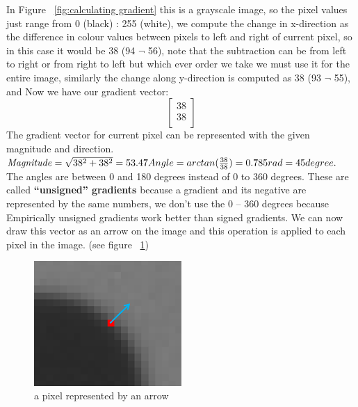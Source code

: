 In Figure ~\ref{fig:calculating gradient} this is a grayscale image, so the pixel values just range from 0 (black) : 255 (white), we compute the change in x-direction as the difference in colour values between pixels to left and right of current pixel, so in this case it would be 38 (94 $ \neg $ 56), note that the subtraction can be from left to right or from right to left but which ever order we take we must use it for the entire image, similarly the change along y-direction is computed as 38 (93 $ \neg $ 55), and Now we have our gradient vector:
\[ \begin{bmatrix}
38\\
38\\
\end{bmatrix} \]
The gradient vector for current pixel can be represented with the given magnitude and direction.
\newline \newline
\begin{math}
\mathit{Magnitude} = 
\sqrt{38^2 +  38^2} = 53.47 \newline Angle = arctan(\frac{38}{38}) = 0.785 rad = 45 degree.
\end{math}
\newline \newline
The angles are between 0 and 180 degrees instead of 0 to 360 degrees. These are called \textbf{“unsigned” gradients} because a gradient and its negative are represented by the same numbers, we don’t use the 0 – 360 degrees because Empirically unsigned gradients work better than signed gradients.
\newline
We can now draw this vector as an arrow on the image and this operation is applied to each pixel in the image. (see figure ~\ref{fig:pixel representation})

\begin{figure}
	\centering
	\includegraphics[width=0.5\textwidth]{images/gray_scale.png}
	\caption{a pixel represented by an arrow}
	\label{fig:pixel representation}
\end{figure}
